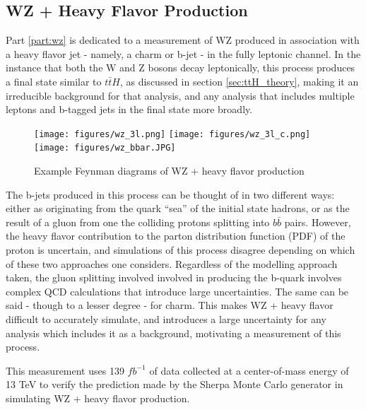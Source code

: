 
\subsection{WZ + Heavy Flavor Production}
\label{sec:WZ_theory}

Part \ref{part:wz} is dedicated to a measurement of WZ produced in association with a heavy flavor jet - namely, a charm or b-jet - in the fully leptonic channel. In the instance that both the W and Z bosons decay leptonically, this process produces a final state similar to $t\bar{t}H$, as discussed in section \ref{sec:ttH_theory}, making it an irreducible background for that analysis, and any analysis that includes multiple leptons and b-tagged jets in the final state more broadly.

\begin{figure}[H]
  \centering
  \texttt{[image: figures/wz\_3l.png]}%
  \texttt{[image: figures/wz\_3l\_c.png]}%
  \texttt{[image: figures/wz\_bbar.JPG]}
  \caption{Example Feynman diagrams of WZ + heavy flavor production}
  \label{fig:wz_feynman}
\end{figure}

The b-jets produced in this process can be thought of in two different ways: either as originating from the quark ``sea'' of the initial state hadrons, or as the result of a gluon from one the colliding protons splitting into $b\bar{b}$ pairs. However, the heavy flavor contribution to the parton distribution function (PDF) of the proton is uncertain, and simulations of this process disagree depending on which of these two approaches one considers. Regardless of the modelling approach taken, the gluon splitting involved involved in producing the b-quark involves complex QCD calculations that introduce large uncertainties. The same can be said - though to a lesser degree - for charm. This makes WZ + heavy flavor difficult to accurately simulate, and introduces a large uncertainty for any analysis which includes it as a background, motivating a measurement of this process.

This measurement uses 139 $fb^{-1}$ of data collected at a center-of-mass energy of 13 TeV to verify the prediction made by the Sherpa Monte Carlo generator \cite{sherpa} in simulating WZ + heavy flavor production.


